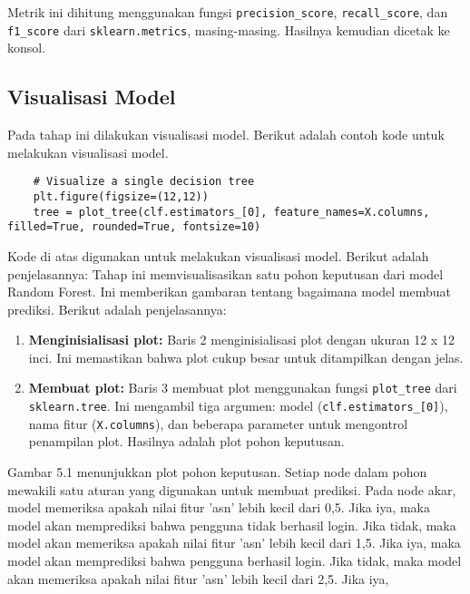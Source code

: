 Metrik ini dihitung menggunakan fungsi \texttt{precision\_score}, \texttt{recall\_score}, dan \texttt{f1\_score} dari \texttt{sklearn.metrics}, masing-masing. Hasilnya kemudian dicetak ke konsol.

\subsection{Visualisasi Model}
Pada tahap ini dilakukan visualisasi model. Berikut adalah contoh kode untuk melakukan visualisasi model.
\begin{lstlisting}
    # Visualize a single decision tree
    plt.figure(figsize=(12,12))
    tree = plot_tree(clf.estimators_[0], feature_names=X.columns, filled=True, rounded=True, fontsize=10)
    \end{lstlisting}

    Kode di atas digunakan untuk melakukan visualisasi model. Berikut adalah penjelasannya:
    Tahap ini memvisualisasikan satu pohon keputusan dari model Random Forest. Ini memberikan gambaran tentang bagaimana model membuat prediksi. Berikut adalah penjelasannya:

    \begin{enumerate}
    \item \textbf{Menginisialisasi plot:} Baris 2 menginisialisasi plot dengan ukuran 12 x 12 inci. Ini memastikan bahwa plot cukup besar untuk ditampilkan dengan jelas.
    \item \textbf{Membuat plot:} Baris 3 membuat plot menggunakan fungsi \texttt{plot\_tree} dari \texttt{sklearn.tree}. Ini mengambil tiga argumen: model (\texttt{clf.estimators\_[0]}), nama fitur (\texttt{X.columns}), dan beberapa parameter untuk mengontrol penampilan plot. Hasilnya adalah plot pohon keputusan.
    \end{enumerate}


        Gambar 5.1 menunjukkan plot pohon keputusan. Setiap node dalam pohon mewakili satu aturan yang digunakan untuk membuat prediksi. Pada node akar, model memeriksa apakah nilai fitur 'asn' lebih kecil dari 0,5. Jika iya, maka model akan memprediksi bahwa pengguna tidak berhasil login. Jika tidak, maka model akan memeriksa apakah nilai fitur 'asn' lebih kecil dari 1,5. Jika iya, maka model akan memprediksi bahwa pengguna berhasil login. Jika tidak, maka model akan memeriksa apakah nilai fitur 'asn' lebih kecil dari 2,5. Jika iya,
        

